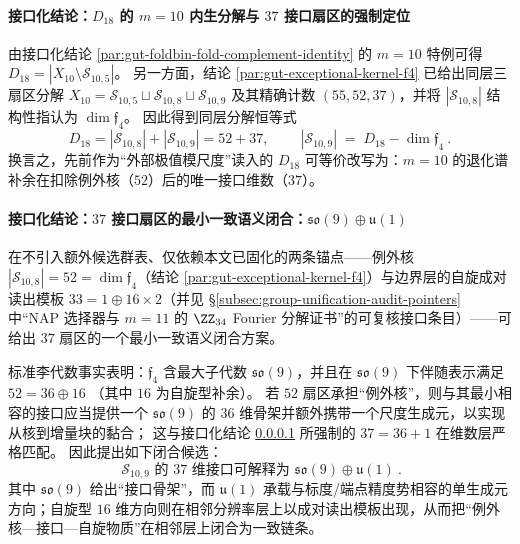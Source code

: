 \paragraph{接口化结论：\texorpdfstring{$D_{18}$}{D18} 的 \texorpdfstring{$m=10$}{m=10} 内生分解与 \texorpdfstring{$37$}{37} 接口扇区的强制定位}\label{par:gut-d18-endogenous-split}
由接口化结论 \ref{par:gut-foldbin-fold-complement-identity} 的 \(m=10\) 特例可得
\(
D_{18}=|X_{10}\setminus\mathcal{S}_{10,5}|
\)。
另一方面，结论 \ref{par:gut-exceptional-kernel-f4} 已给出同层三扇区分解
\(
X_{10}=\mathcal{S}_{10,5}\sqcup\mathcal{S}_{10,8}\sqcup\mathcal{S}_{10,9}
\)
及其精确计数 \((55,52,37)\)，并将 \(|\mathcal{S}_{10,8}|\) 结构性指认为 \(\dim\mathfrak{f}_4\)。
因此得到同层分解恒等式
\[
D_{18}=|\mathcal{S}_{10,8}|+|\mathcal{S}_{10,9}|=52+37,
\qquad
\boxed{\ |\mathcal{S}_{10,9}|\;=\;D_{18}-\dim\mathfrak{f}_4\ }.
\]
换言之，先前作为“外部极值模尺度”读入的 \(D_{18}\) 可等价改写为：\(m=10\) 的退化谱补余在扣除例外核（\(52\)）后的唯一接口维数（\(37\)）。

\paragraph{接口化结论：\texorpdfstring{$37$}{37} 接口扇区的最小一致语义闭合：\texorpdfstring{$\mathfrak{so}(9)\oplus\mathfrak{u}(1)$}{so(9)+u(1)}}\label{par:gut-sector37-so9-u1}
在不引入额外候选群表、仅依赖本文已固化的两条锚点——例外核 \(|\mathcal{S}_{10,8}|=52=\dim\mathfrak{f}_4\)（结论 \ref{par:gut-exceptional-kernel-f4}）与边界层的自旋成对读出模板 \(33=1\oplus 16\times 2\)（并见 \S\ref{subsec:group-unification-audit-pointers} 中“NAP 选择器与 \(m=11\) 的 \(\ZZ_{34}\) Fourier 分解证书”的可复核接口条目）——可给出 \(37\) 扇区的一个最小一致语义闭合方案。
\par
标准李代数事实表明：\(\mathfrak{f}_4\) 含最大子代数 \(\mathfrak{so}(9)\)，并且在 \(\mathfrak{so}(9)\) 下伴随表示满足
\(
52=36\oplus 16
\)
（其中 \(16\) 为自旋型补余）。
若 \(52\) 扇区承担“例外核”，则与其最小相容的接口应当提供一个 \(\mathfrak{so}(9)\) 的 \(36\) 维骨架并额外携带一个尺度生成元，以实现从核到增量块的黏合；
这与接口化结论 \ref{par:gut-d18-endogenous-split} 所强制的
\(
37=36+1
\)
在维数层严格匹配。
因此提出如下闭合候选：
\[
\boxed{\ \mathcal{S}_{10,9}\text{ 的 \(37\) 维接口可解释为 }\mathfrak{so}(9)\oplus\mathfrak{u}(1)\ }.
\]
其中 \(\mathfrak{so}(9)\) 给出“接口骨架”，而 \(\mathfrak{u}(1)\) 承载与标度/端点精度势相容的单生成元方向；自旋型 \(16\) 维方向则在相邻分辨率层上以成对读出模板出现，从而把“例外核—接口—自旋物质”在相邻层上闭合为一致链条。

